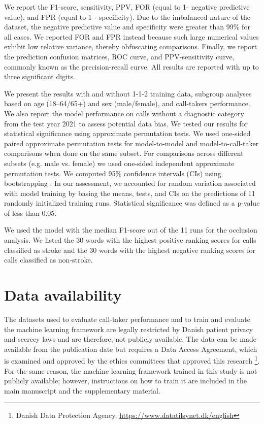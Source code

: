 {We report the F1-score, sensitivity, PPV, FOR (equal to 1- negative predictive value), and FPR (equal to 1 - specificity). Due to the imbalanced nature of the dataset, the negative predictive value and specificity were greater than 99\% for all cases. We reported FOR and FPR instead because such large numerical values exhibit low relative variance, thereby obfuscating comparisons. Finally, we report the prediction confusion matrices, ROC curve, and PPV-sensitivity curve, commonly known as the precision-recall curve. All results are reported with up to three significant digits.

We present the results with and without 1-1-2 training data, subgroup analyses based on age (18–64/65+) and sex (male/female), and call-takers performance. We also report the model performance on calls without a diagnostic category from the test year 2021 to assess potential data bias. We tested our results for statistical significance using approximate permutation tests. We used one-sided paired approximate permutation tests for model-to-model and model-to-call-taker comparisons when done on the same subset. For comparisons across different subsets (e.g. male vs. female) we used one-sided independent approximate permutation tests. We computed 95\% confidence intervals (CIs) using bootstrapping \parencite{dwass_modified_1957,eden_validity_1933}. In our assessment, we accounted for random variation associated with model training by basing the means, tests, and CIs on the predictions of 11 randomly initialized training runs. Statistical significance was defined as a p-value of less than 0.05.

We used the model with the median F1-score out of the 11 runs for the occlusion analysis. We listed the 30 words with the highest positive ranking scores for calls classified as stroke and the 30 words with the highest negative ranking scores for calls classified as non-stroke.


\section*{Data availability}

The datasets used to evaluate call-taker performance and to train and evaluate the machine learning framework are legally restricted by Danish patient privacy and secrecy laws and are therefore, not publicly available. The data can be made available from the publication date but requires a Data Access Agreement, which is examined and approved by the ethics committees that approved this research \footnote{Danish Data Protection Agency, \url{https://www.datatilsynet.dk/english}}. For the same reason, the machine learning framework trained in this study is not publicly available; however, instructions on how to train it are included in the main manuscript and the supplementary material. 


}
